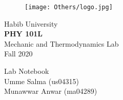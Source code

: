 \begin{titlepage}

\begin{center}

\vspace{-30mm}

\begin{figure}[h]
    \centering
    \texttt{[image: Others/logo.jpg]}
    \label{logo}
\end{figure}

\large Habib University \\
\vspace{5mm}
\textbf{PHY 101L} \\
Mechanic and Thermodynamics Lab\\ 
Fall 2020

\vspace{30mm}
\Large Lab Notebook\\
\large Umme Salma (us04315)\\
\large Munawwar Anwar (ma04289)\\

\end{center}

\clearpage
\thispagestyle{empty}
\null
\clearpage

\end{titlepage}
